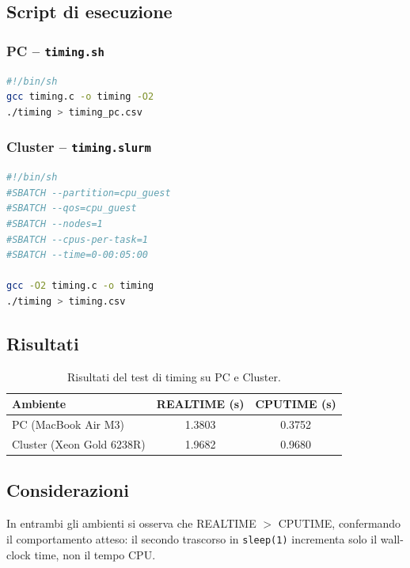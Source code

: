 \documentclass[a4paper,12pt]{article}
\begin{document}
\subsection{Script di esecuzione}

\subsubsection{PC -- \texttt{timing.sh}}
\begin{lstlisting}[language=bash]
#!/bin/sh
gcc timing.c -o timing -O2
./timing > timing_pc.csv
\end{lstlisting}

\subsubsection{Cluster -- \texttt{timing.slurm}}
\begin{lstlisting}[language=bash]
#!/bin/sh
#SBATCH --partition=cpu_guest
#SBATCH --qos=cpu_guest
#SBATCH --nodes=1
#SBATCH --cpus-per-task=1
#SBATCH --time=0-00:05:00

gcc -O2 timing.c -o timing
./timing > timing.csv
\end{lstlisting}

\subsection{Risultati}

\begin{table}[H]
\centering
\begin{tabular}{lcc}
\toprule
\textbf{Ambiente} & \textbf{REALTIME (s)} & \textbf{CPUTIME (s)} \\
\midrule
PC (MacBook Air M3)        & 1.3803 & 0.3752 \\
Cluster (Xeon Gold 6238R)  & 1.9682 & 0.9680 \\
\bottomrule
\end{tabular}
\caption{Risultati del test di timing su PC e Cluster.}
\end{table}

\subsection{Considerazioni}

In entrambi gli ambienti si osserva che REALTIME $>$ CPUTIME, confermando il comportamento atteso: il secondo trascorso in \texttt{sleep(1)} incrementa solo il wall-clock time, non il tempo CPU.
\end{document}
